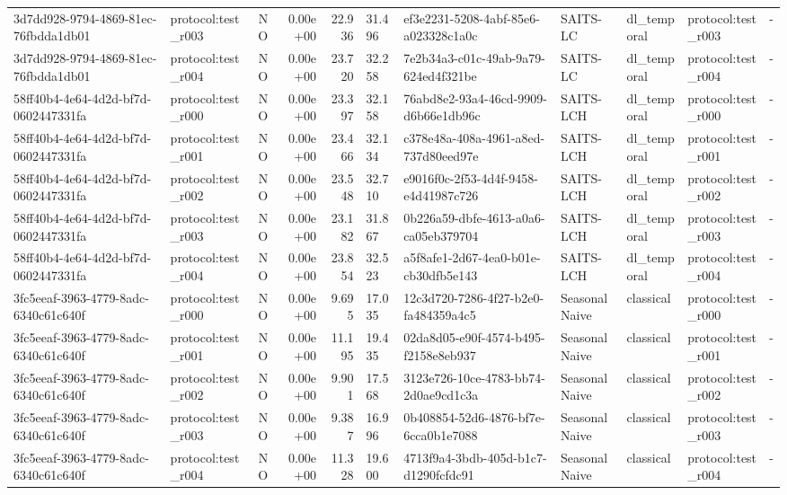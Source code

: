 \begin{table}[htbp]
\begin{tabular}{llrrr}
3d7dd928-9794-4869-81ec-76fbdda1db01 & protocol:test\_r003 & NO & 0.00e+00 & 22.936 & 31.496 & ef3e2231-5208-4abf-85e6-a023328c1a0c & SAITS-LC & dl\_temporal & protocol:test\_r003 & - \\
3d7dd928-9794-4869-81ec-76fbdda1db01 & protocol:test\_r004 & NO & 0.00e+00 & 23.720 & 32.258 & 7e2b34a3-c01c-49ab-9a79-624ed4f321be & SAITS-LC & dl\_temporal & protocol:test\_r004 & - \\
58ff40b4-4e64-4d2d-bf7d-0602447331fa & protocol:test\_r000 & NO & 0.00e+00 & 23.397 & 32.158 & 76abd8e2-93a4-46cd-9909-d6b66e1db96c & SAITS-LCH & dl\_temporal & protocol:test\_r000 & - \\
58ff40b4-4e64-4d2d-bf7d-0602447331fa & protocol:test\_r001 & NO & 0.00e+00 & 23.466 & 32.134 & c378e48a-408a-4961-a8ed-737d80eed97e & SAITS-LCH & dl\_temporal & protocol:test\_r001 & - \\
58ff40b4-4e64-4d2d-bf7d-0602447331fa & protocol:test\_r002 & NO & 0.00e+00 & 23.548 & 32.710 & e9016f0c-2f53-4d4f-9458-e4d41987c726 & SAITS-LCH & dl\_temporal & protocol:test\_r002 & - \\
58ff40b4-4e64-4d2d-bf7d-0602447331fa & protocol:test\_r003 & NO & 0.00e+00 & 23.182 & 31.867 & 0b226a59-dbfe-4613-a0a6-ca05eb379704 & SAITS-LCH & dl\_temporal & protocol:test\_r003 & - \\
58ff40b4-4e64-4d2d-bf7d-0602447331fa & protocol:test\_r004 & NO & 0.00e+00 & 23.854 & 32.523 & a5f8afe1-2d67-4ea0-b01e-cb30dfb5e143 & SAITS-LCH & dl\_temporal & protocol:test\_r004 & - \\
3fc5eeaf-3963-4779-8adc-6340c61c640f & protocol:test\_r000 & NO & 0.00e+00 & 9.695 & 17.035 & 12c3d720-7286-4f27-b2e0-fa484359a4c5 & SeasonalNaive & classical & protocol:test\_r000 & - \\
3fc5eeaf-3963-4779-8adc-6340c61c640f & protocol:test\_r001 & NO & 0.00e+00 & 11.195 & 19.435 & 02da8d05-e90f-4574-b495-f2158e8eb937 & SeasonalNaive & classical & protocol:test\_r001 & - \\
3fc5eeaf-3963-4779-8adc-6340c61c640f & protocol:test\_r002 & NO & 0.00e+00 & 9.901 & 17.568 & 3123e726-10ce-4783-bb74-2d0ae9cd1c3a & SeasonalNaive & classical & protocol:test\_r002 & - \\
3fc5eeaf-3963-4779-8adc-6340c61c640f & protocol:test\_r003 & NO & 0.00e+00 & 9.387 & 16.996 & 0b408854-52d6-4876-bf7e-6cca0b1e7088 & SeasonalNaive & classical & protocol:test\_r003 & - \\
3fc5eeaf-3963-4779-8adc-6340c61c640f & protocol:test\_r004 & NO & 0.00e+00 & 11.328 & 19.600 & 4713f9a4-3bdb-405d-b1c7-d1290fcfdc91 & SeasonalNaive & classical & protocol:test\_r004 & - \\

\end{tabular}
\end{table}
